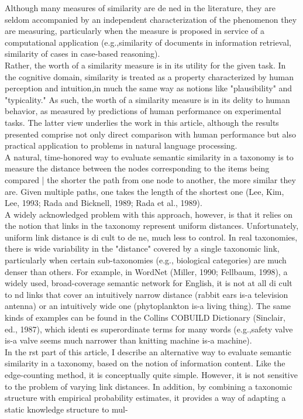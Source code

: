 Although many measures of similarity are de ned in the literature, they are seldom accompanied by an independent characterization of the phenomenon they are measuring, particularly when the measure is proposed in service of a computational application (e.g.,similarity of documents in information retrieval, similarity of cases in case-based reasoning).\\
Rather, the worth of a similarity measure is in its utility for the given task. In the cognitive domain, similarity is treated as a property characterized by human perception and intuition,in much the same way as notions like "plausibility" and "typicality." As such, the worth of a similarity measure is in its delity to human behavior, as measured by predictions of human performance on experimental tasks. The latter view underlies the work in this article, although the results presented comprise not only direct comparison with human performance but also practical application to problems in natural language processing.\\
    A natural, time-honored way to evaluate semantic similarity in a taxonomy is to measure the distance between the nodes corresponding to the items being compared | the shorter the path from one node to another, the more similar they are. Given multiple paths, one
takes the length of the shortest one (Lee, Kim, Lee, 1993; Rada and Bicknell, 1989; Rada et al., 1989).\\
    A widely acknowledged problem with this approach, however, is that it relies on the notion that links in the taxonomy represent uniform distances. Unfortunately, uniform link distance is di cult to de ne, much less to control. In real taxonomies, there is wide
variability in the "distance" covered by a single taxonomic link, particularly when certain sub-taxonomies (e.g., biological categories) are much denser than others. For example, in WordNet (Miller, 1990; Fellbaum, 1998), a widely used, broad-coverage semantic network for English, it is not at all di cult to nd links that cover an intuitively narrow distance (rabbit ears is-a television antenna) or an intuitively wide one (phytoplankton
is-a living thing). The same kinds of examples can be found in the Collins COBUILD Dictionary (Sinclair, ed., 1987), which identi es superordinate terms for many words (e.g.,safety valve is-a valve seems much narrower than knitting machine is-a machine).\\
    In the rst part of this article, I describe an alternative way to evaluate semantic similarity in a taxonomy, based on the notion of information content. Like the edge-counting method, it is conceptually quite simple. However, it is not sensitive to the problem of varying link distances. In addition, by combining a taxonomic structure with empirical probability estimates, it provides a way of adapting a static knowledge structure to mul-
